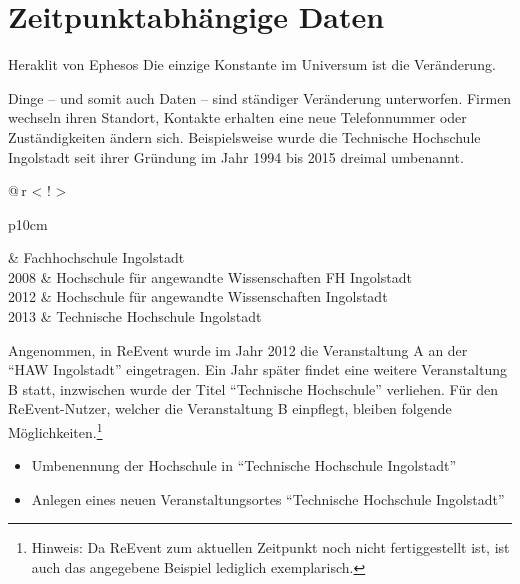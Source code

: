 \section{Zeitpunktabhängige Daten}
\label{sec:history.steps}

\begin{chapquote}{Heraklit von Ephesos}
	Die einzige Konstante im Universum ist die Veränderung.
\end{chapquote}


Dinge -- und somit auch Daten -- sind ständiger Veränderung unterworfen. Firmen wechseln ihren Standort, Kontakte erhalten eine neue Telefonnummer oder Zuständigkeiten ändern sich. Beispielsweise wurde die Technische Hochschule Ingolstadt seit ihrer Gründung im Jahr 1994 bis 2015 dreimal umbenannt.

\begin{table}[ht!]
\begin{margincap}

\renewcommand\arraystretch{1.4}
\centering
\begin{tabular}{@{\,}r <{\hskip 10pt} !{\Large\timelinebullet} >{\raggedright\arraybackslash}p{10cm}}

	 & Fachhochschule Ingolstadt \\
	2008 & Hochschule für angewandte Wissenschaften FH Ingolstadt \\
	2012 & Hochschule für angewandte Wissenschaften Ingolstadt \\
	2013 & Technische Hochschule Ingolstadt \\
\end{tabular}
\caption{Zeitleiste der TH Ingolstadt von der Gründung bis zum Jahr 2015}
\label{tab:th.timeline}
\end{margincap}
\end{table}


Angenommen, in ReEvent wurde im Jahr 2012 die Veranstaltung A an der \enquote{HAW Ingolstadt} eingetragen. Ein Jahr später findet eine weitere Veranstaltung B statt, inzwischen wurde der Titel \enquote{Technische Hochschule} verliehen. Für den ReEvent-Nutzer, welcher die Veranstaltung B einpflegt, bleiben folgende Möglichkeiten.\footnote{Hinweis: Da ReEvent zum aktuellen Zeitpunkt noch nicht fertiggestellt ist, ist auch das angegebene Beispiel lediglich exemplarisch.}

\begin{itemize}
	\item Umbenennung der Hochschule in  \enquote{Technische Hochschule Ingolstadt}
	\item Anlegen eines neuen Veranstaltungsortes \enquote{Technische Hochschule Ingolstadt}
\end{itemize}

